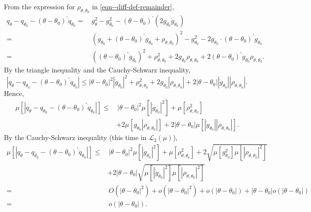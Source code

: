 \documentclass[12pt]{article}
\theoremstyle{definition}
\theoremstyle{plain}
\begin{document}
From the expression for \(\rho_{\theta, \theta_{0}}\) in
\eqref{eqn--diff-def-remainder},
\begin{align*}
  q_{\theta} - q_{\theta_{0}} - (\theta - \theta_{0})^{\prime}
  \dot{q}_{\theta_{0}} =
  & \,
  g_{\theta}^{2} - g_{\theta_{0}}^{2} - (\theta - \theta_{0})^{\prime} \left( 2
  g_{\theta_{0}} \dot{g}_{\theta_{0}} \right) \\
  =
  & \, \left( g_{\theta_{0}} + (\theta - \theta_{0})^{\prime}
  \dot{g}_{\theta_{0}} + \rho_{\theta, \theta_{0}} \right)^{2} -
  g_{\theta_{0}}^{2} - 2 g_{\theta_{0}} \cdot (\theta - \theta_{0})^{\prime}
  \dot{g}_{\theta_{0}} \\
  =
  & \, \left( (\theta - \theta_{0})^{\prime} \dot{g}_{\theta_{0}} \right)^{2} +
  \rho_{\theta, \theta_{0}}^{2} + 2 g_{\theta_{0}} \rho_{\theta, \theta_{0}} + 2
  (\theta - \theta_{0})^{\prime} \dot{g}_{\theta_{0}} \rho_{\theta, \theta_{0}}.
\end{align*}
By the triangle inequality and the Cauchy-Schwarz inequality,
\begin{equation*}
  \left| q_{\theta} - q_{\theta_{0}} - (\theta - \theta_{0})^{\prime}
  \dot{q}_{\theta_{0}} \right| \leq |\theta - \theta_{0}|^{2} \left|
  \dot{g}_{\theta_{0}} \right|^{2} + \rho_{\theta, \theta_{0}}^{2} + 2
  g_{\theta_{0}} \left| \rho_{\theta, \theta_{0}} \right| + 2 |\theta -
  \theta_{0}| \left| \dot{g}_{\theta_{0}} \right| \left| \rho_{\theta,
  \theta_{0}} \right|.
\end{equation*}
Hence,
\begin{equation*}
  \begin{split}
    \mu \left[ \left| q_{\theta} - q_{\theta_{0}} - (\theta -
    \theta_{0})^{\prime} \dot{q}_{\theta_{0}} \right| \right] \leq
    & \, |\theta - \theta_{0}|^{2} \mu \left[ \left| \dot{g}_{\theta_{0}}
    \right|^{2} \right] + \mu \left[ \rho_{\theta, \theta_{0}}^{2} \right] \\
    & + 2 \mu \left[ g_{\theta_{0}} \left| \rho_{\theta, \theta_{0}} \right|
    \right] + 2 |\theta - \theta_{0}| \mu \left[ \left| \dot{g}_{\theta_{0}}
    \right| \left| \rho_{\theta, \theta_{0}} \right| \right].
  \end{split}
\end{equation*}
By the Cauchy-Schwarz inequality (this time in \(\mathscr{L}_{2} (\mu)\)),
\begin{align*}
  \mu \left[ \left| q_{\theta} - q_{\theta_{0}} - (\theta - \theta_{0})^{\prime}
  \dot{q}_{\theta_{0}} \right| \right] \leq
  & \, |\theta - \theta_{0}|^{2} \mu \left[ \left| \dot{g}_{\theta_{0}}
  \right|^{2} \right] + \mu \left[ \rho_{\theta, \theta_{0}}^{2} \right] + 2
  \sqrt{\mu \left[ g_{\theta_{0}}^{2} \right] \mu \left[ \left| \rho_{\theta,
  \theta_{0}} \right|^{2} \right]} \\
  & + 2 |\theta - \theta_{0}| \sqrt{\mu \left[ \left| \dot{g}_{\theta_{0}}
  \right|^{2} \right] \mu \left[ \left| \rho_{\theta, \theta_{0}} \right|^{2}
  \right]} \\
  =
  & \, O \left( |\theta - \theta_{0}|^{2} \right) + o \left( |\theta -
  \theta_{0}|^{2} \right) + o \left( |\theta - \theta_{0}| \right) + |\theta -
  \theta_{0}| o (|\theta - \theta_{0}|) \\
  =
  & \, o (|\theta - \theta_{0}|).
\end{align*}
\end{document}
